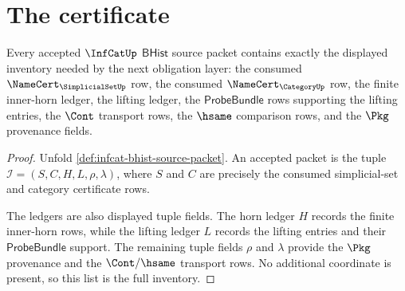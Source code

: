 \section{The certificate}
\label{sec:infcat-certificate}

\begin{theorem}
\label{thm:infcat-obligation-inventory-fields}
Every accepted $\InfCatUp$ $\mathsf{BHist}$ source packet contains exactly the
displayed inventory needed by the next obligation layer: the consumed
$\NameCert_{\SimplicialSetUp}$ row, the consumed $\NameCert_{\CategoryUp}$ row,
the finite inner-horn ledger, the lifting ledger, the $\mathsf{ProbeBundle}$
rows supporting the lifting entries, the $\Cont$ transport rows, the $\hsame$
comparison rows, and the $\Pkg$ provenance fields.
\end{theorem}
\begin{proof}
Unfold \autoref{def:infcat-bhist-source-packet}. An accepted packet is the
tuple $\mathcal{I}=(S,C,H,L,\rho,\lambda)$, where $S$ and $C$ are precisely the
consumed simplicial-set and category certificate rows.

The ledgers are also displayed tuple fields. The horn ledger $H$ records the
finite inner-horn rows, while the lifting ledger $L$ records the lifting
entries and their $\mathsf{ProbeBundle}$ support. The remaining tuple fields
$\rho$ and $\lambda$ provide the $\Pkg$ provenance and the $\Cont/\hsame$
transport rows. No additional coordinate is present, so this list is the full
inventory.
\end{proof}

